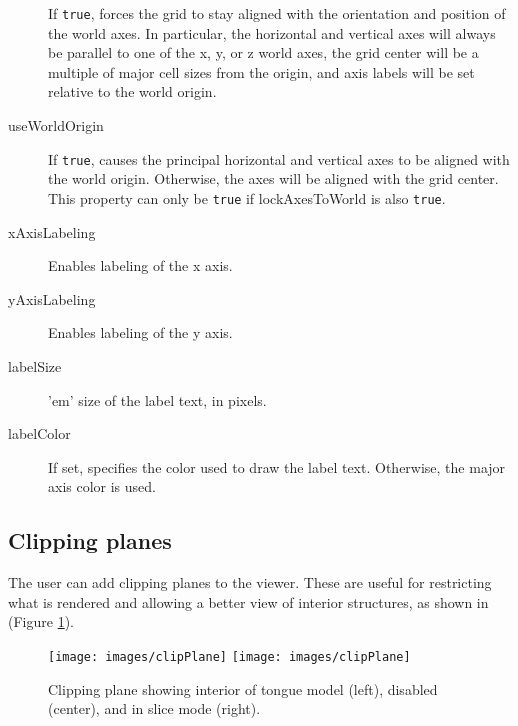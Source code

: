 \documentclass{article}
\begin{document}
\begin{description}
If {\tt true}, forces the grid to stay aligned with the orientation
and position of the world axes. In particular, the horizontal and
vertical axes will always be parallel to one of the x, y, or z world
axes, the grid center will be a multiple of major cell sizes from the
origin, and axis labels will be set relative to the world origin.

\item[useWorldOrigin]\mbox{}

If {\tt true}, causes the principal horizontal and vertical axes to be
aligned with the world origin. Otherwise, the axes will be aligned
with the grid center. This property can only be {\tt true} if {\sf
lockAxesToWorld} is also {\tt true}.

\item[xAxisLabeling]\mbox{}

Enables labeling of the x axis.

\item[yAxisLabeling]\mbox{}

Enables labeling of the y axis.

\item[labelSize]\mbox{}

'em' size of the label text, in pixels.

\item[labelColor]\mbox{}

If set, specifies the color used to draw the label text. Otherwise,
the major axis color is used.

\end{description}

\subsection{Clipping planes}
\label{ClippingPlanesSec}

The user can add clipping planes to the viewer. These are useful for
restricting what is rendered and allowing a better view of interior
structures, as shown in (Figure \ref{clipPlaneFig}).

\begin{figure}
\begin{center}
\iflatexml
\texttt{[image: images/clipPlane]}
\else
\texttt{[image: images/clipPlane]}
\fi
\end{center}
\caption{Clipping plane showing interior of tongue model (left), disabled (center), and in slice mode (right).}%
\label{clipPlaneFig}
\end{figure}
\end{document}
